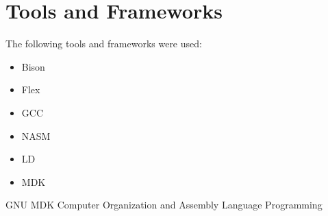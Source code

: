 \documentclass{article}
\begin{document}
\section{Tools and Frameworks}
The following tools and frameworks were used:
\begin{itemize}
  \item Bison
  \item Flex
  \item GCC
  \item NASM
  \item LD
  \item MDK
\end{itemize}

\begin{thebibliography}{9}
    GNU MDK
        Computer Organization and Assembly Language Programming
\end{thebibliography}
\end{document}

